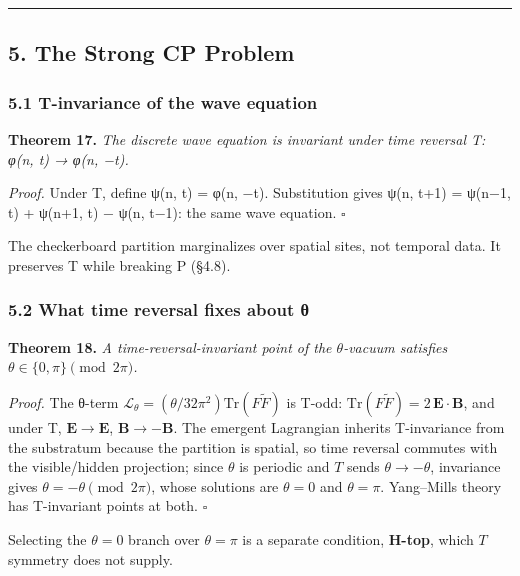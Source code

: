 \documentclass[
]{article}
\begin{document}
\begin{center}\rule{0.5\linewidth}{0.5pt}\end{center}

\hypertarget{the-strong-cp-problem}{%
\subsection{5. The Strong CP Problem}\label{the-strong-cp-problem}}

\hypertarget{t-invariance-of-the-wave-equation}{%
\subsubsection{5.1 T-invariance of the wave
equation}\label{t-invariance-of-the-wave-equation}}

\textbf{Theorem 17.} \emph{The discrete wave equation is invariant under
time reversal T: φ(n, t) → φ(n, −t).}

\emph{Proof.} Under T, define ψ(n, t) = φ(n, −t). Substitution gives
ψ(n, t+1) = ψ(n−1, t) + ψ(n+1, t) − ψ(n, t−1): the same wave equation.
\(\square\)

The checkerboard partition marginalizes over spatial sites, not temporal
data. It preserves T while breaking P (§4.8).

\hypertarget{what-time-reversal-fixes-about-ux3b8}{%
\subsubsection{5.2 What time reversal fixes about
θ}\label{what-time-reversal-fixes-about-ux3b8}}

\textbf{Theorem 18.} \emph{A time-reversal-invariant point of the
\(\theta\)-vacuum satisfies \(\theta\in\{0,\pi\}\pmod{2\pi}\).}

\emph{Proof.} The θ-term
\(\mathcal{L}_\theta = (\theta/32\pi^2) \mathrm{Tr}(F \tilde{F})\) is
T-odd: \(\mathrm{Tr}(F\tilde{F}) = 2\,\mathbf{E} \cdot \mathbf{B}\), and
under T, \(\mathbf{E} \to \mathbf{E}\), \(\mathbf{B} \to -\mathbf{B}\).
The emergent Lagrangian inherits T-invariance from the substratum
because the partition is spatial, so time reversal commutes with the
visible/hidden projection; since \(\theta\) is periodic and \(T\) sends
\(\theta\to-\theta\), invariance gives \(\theta=-\theta\pmod{2\pi}\),
whose solutions are \(\theta=0\) and \(\theta=\pi\). Yang--Mills theory
has T-invariant points at both. \(\square\)

Selecting the \(\theta = 0\) branch over \(\theta=\pi\) is a separate
condition, \textbf{H-top}, which \(T\) symmetry does not supply.
\end{document}
